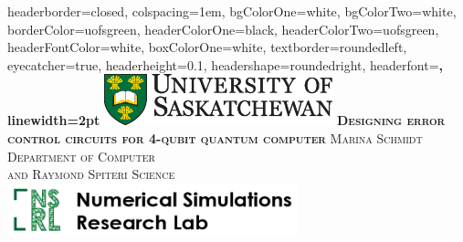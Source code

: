 \documentclass[landscape,a0paper,fontscale=0.285]{baposter} %
\begin{document}
\begin{poster}
{
headerborder=closed, %
colspacing=1em, %
bgColorOne=white, %
bgColorTwo=white, %
borderColor=uofsgreen, %
headerColorOne=black, %
headerColorTwo=uofsgreen, %
headerFontColor=white, %
boxColorOne=white, %
textborder=roundedleft, %
eyecatcher=true, %
headerheight=0.1\textheight, %
headershape=roundedright, %
headerfont=\Large\bf\textsc, %
linewidth=2pt %
}
%
{\includegraphics[height=4em]{UofS}} %
{\bf\textsc{Designing error control circuits for 4-qubit quantum computer}\vspace{0.5em}} %
{\hspace{85pt}\textsc{Marina Schmidt \hspace{50pt}  Department of Computer      \\and Raymond Spiteri\hspace{110pt}       Science}} %
{\includegraphics[height=4em]{NRSL-Mesh2-01.png}} %


\end{poster}
\end{document}
